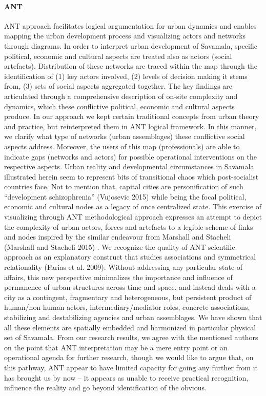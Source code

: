 \documentclass[11pt]{report}
\begin{document}
\paragraph{ANT}
ANT approach facilitates logical argumentation for urban dynamics and enables mapping the urban development process and visualizing actors and networks through diagrams. In order to interpret urban development of Savamala, specific political, economic and cultural aspects are treated also as actors (social artefacts). Distribution of these networks are traced within the map through the identification of (1)  key actors involved, (2) levels of decision making it stems from, (3) sets of social aspects aggregated together. The key findings are articulated through a comprehensive description of on-site complexity and dynamics, which these conflictive political, economic and cultural aspects produce. In our approach we kept certain traditional concepts from urban theory and practice, but reinterpreted them in ANT logical framework. In this manner, we clarify what type of networks (urban assemblages) these conflictive social aspects address. Moreover, the users of this map (professionals) are able to indicate gaps (networks and actors) for possible operational interventions on the respective aspects. 
Urban reality and developmental circumstances in Savamala illustrated herein seem to represent bits of transitional chaos which post-socialist countries face. Not to mention that, capital cities are personification of such “development schizophrenia” (Vujosevic 2015) while being the focal political, economic and cultural nodes as a legacy of once centralized state. This exercise of visualizing through ANT methodological approach expresses an attempt to depict the complexity of urban actors, forces and artefacts to a legible scheme of links and nodes inspired by the similar endeavour from Marshall and Staeheli (Marshall and Staeheli 2015) . We recognize the quality of ANT scientific approach as an explanatory construct that studies associations and symmetrical relationality (Farias et al. 2009). Without addressing any particular state of affairs, this new perspective minimalizes the importance and influence of permanence of urban structures across time and space, and instead deals with a city as a contingent, fragmentary and heterogeneous, but persistent product of human/non-human actors, intermediary/mediator roles, concrete associations, stabilizing and destabilizing agencies and urban assemblages. We have shown that all these elements are spatially embedded and harmonized in particular physical set of Savamala. From our research results, we agree with the mentioned authors on the point that ANT interpretation may be a mere entry point or an operational agenda for further research, though we would like to argue that, on this pathway, ANT appear to have limited capacity for going any further from it has brought us by now – it appears as unable to receive practical recognition, influence the reality and go beyond identification of the obvious.
\end{document}

